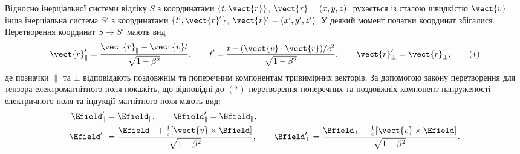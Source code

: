 \begin{problem}\label{prb:3.3}
Відносно інерціальної системи відліку $S$ з координатами $\{t,\vect{r}\}$, $\vect{r}=(x,y,z)$, рухається із сталою швидкістю $\vect{v}$ інша інерціальна система $S'$ з координатами $\{t',\vect{r}'\}$, $\vect{r}'=(x',y',z')$. У деякий момент початки координат збігалися. Перетворення координат $S\to S'$ мають вид
\begin{equation*}
    \vect{r}'_{\|} = \frac{\vect{r}_{\|} - \vect{v}t}{\sqrt{1-\beta^2}},
    \qquad
    t' = \frac{t - (\vect{v}\cdot\vect{r})/c^2}{\sqrt{1-\beta^2}},
    \qquad
    \vect{r}'_{\bot} = \vect{r}_{\bot},
    \tag{$*$}
\end{equation*}
де позначки $\|$ та $\bot$ відповідають поздовжнім та поперечним компонентам тривимірних векторів. За допомогою закону перетворення для тензора електромагнітного поля покажіть, що відповідні до $(*)$ перетворення поперечних та поздовжніх компонент напруженості електричного поля та індукції магнітного поля мають вид:
\begin{align*}
    \Efield'_{\|} &= \Efield_{\|},
    \qquad
    \Bfield'_{\|} = \Bfield_{\|}, \\
    \Efield'_{\bot} &= \frac{\Efield_{\bot}
    + \tfrac{1}{c}[\vect{v}\times\Bfield]}{\sqrt{1-\beta^2}},
    \qquad
    \Bfield'_{\bot} = \frac{\Bfield_{\bot}
    - \tfrac{1}{c}[\vect{v}\times\Efield]}{\sqrt{1-\beta^2}}.
\end{align*}
\end{problem}


